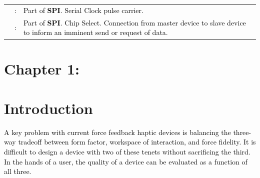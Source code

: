 \documentclass[a4paper]{article}
\begin{document}
\begin{flushleft}
\begin{supertabular}{m{1.52cm}m{0.32200003cm}m{13.557cm}}
 &
{ \textcolor{black}{:}} &
{ \textcolor{black}{Part of }\textbf{\textcolor{black}{SPI}}\textcolor{black}{. Serial Clock
pulse carrier.}}\\
 &
{ \textcolor{black}{:}} &
{ \textcolor{black}{Part of }\textbf{\textcolor{black}{SPI}}\textcolor{black}{. Chip Select.
Connection from master device to slave device to inform an imminent send or request of data.}}\\
\end{supertabular}
\end{flushleft}

\bigskip


\bigskip


\bigskip


\bigskip


\bigskip


\bigskip


\bigskip


\bigskip


\bigskip


\bigskip


\bigskip


\bigskip


\bigskip


\bigskip

\section[Chapter 1:]{\textbf{Chapter 1:}}
\hypertarget{Toc98342032}{}\section[Introduction ]{\textbf{Introduction}\textbf{ }}

\bigskip


\bigskip

\textcolor{black}{A key problem with current force feedback haptic devices is balancing the three-way tradeoff between
form factor, workspace of interaction, and force fidelity. It is difficult to design a device with two of these tenets
without sacrificing the third. In the hands of a user, the quality of a device can be evaluated as a function of all
three.}
\end{document}
